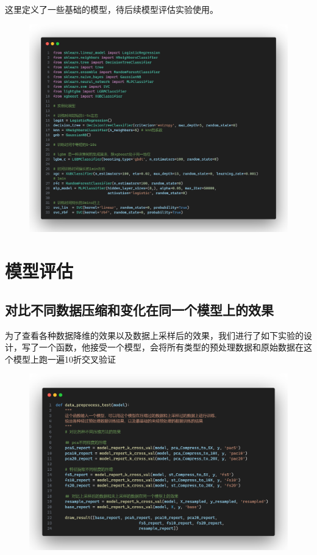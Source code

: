 \documentclass{article}
\begin{document}
这里定义了一些基础的模型，待后续模型评估实验使用。
\begin{figure}[H]
	\centering
	\includegraphics[width=\textwidth]{./img/models.png}
\end{figure}

\section{模型评估}
\subsection{对比不同数据压缩和变化在同一个模型上的效果}
为了查看各种数据降维的效果以及数据上采样后的效果，我们进行了如下实验的设计，写了一个函数，他接受一个模型，会将所有类型的预处理数据和原始数据在这个模型上跑一遍10折交叉验证
\begin{figure}[H]
	\centering
	\includegraphics[width=\textwidth]{./img/data_prepocess_test.png}
\end{figure}
\end{document}
